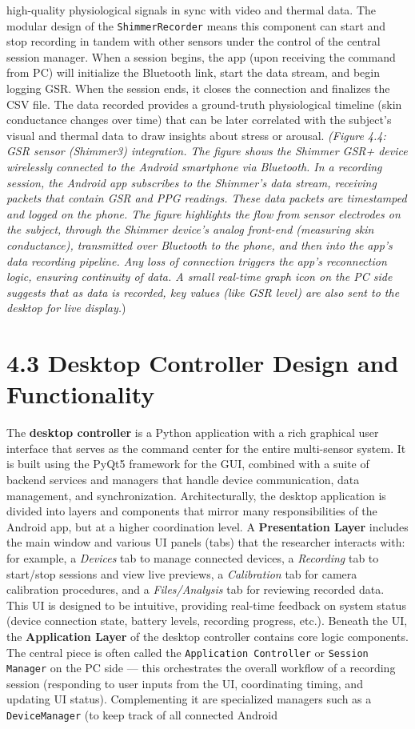 high-quality physiological signals in sync with video and thermal data. The modular design of the \texttt{ShimmerRecorder} means this component can start and stop recording in tandem with other sensors under the control of the central session manager. When a session begins, the app (upon receiving the command from PC) will initialize the Bluetooth link, start the data stream, and begin logging GSR. When the session ends, it closes the connection and finalizes the CSV file. The data recorded provides a ground-truth physiological timeline (skin conductance changes over time) that can be later correlated with the subject's visual and thermal data to draw insights about stress or arousal. \textit{(Figure 4.4: GSR sensor (Shimmer3) integration. The figure shows the Shimmer GSR+ device wirelessly connected to the Android smartphone via Bluetooth. In a recording session, the Android app subscribes to the Shimmer's data stream, receiving packets that contain GSR and PPG readings. These data packets are timestamped and logged on the phone. The figure highlights the flow from} \textit{sensor electrodes on the subject, through the Shimmer device's analog front-end (measuring skin conductance), transmitted over Bluetooth to the phone, and then into the app's data recording pipeline. Any loss of connection triggers the app's reconnection logic, ensuring continuity of data. A small real-time graph icon on the PC side suggests that as data is recorded, key values (like GSR level) are also sent to the desktop for live display.}) \section{4.3 Desktop Controller Design and Functionality} The \textbf{desktop controller} is a Python application with a rich graphical user interface that serves as the command center for the entire multi-sensor system. It is built using the PyQt5 framework for the GUI, combined with a suite of backend services and managers that handle device communication, data management, and synchronization. Architecturally, the desktop application is divided into layers and components that mirror many responsibilities of the Android app, but at a higher coordination level. A \textbf{Presentation Layer} includes the main window and various UI panels (tabs) that the researcher interacts with: for example, a \textit{Devices} tab to manage connected devices, a \textit{Recording} tab to start/stop sessions and view live previews, a \textit{Calibration} tab for camera calibration procedures, and a \textit{Files/Analysis} tab for reviewing recorded data. This UI is designed to be intuitive, providing real-time feedback on system status (device connection state, battery levels, recording progress, etc.). Beneath the UI, the \textbf{Application Layer} of the desktop controller contains core logic components. The central piece is often called the \texttt{Application Controller} or \texttt{Session Manager} on the PC side --- this orchestrates the overall workflow of a recording session (responding to user inputs from the UI, coordinating timing, and updating UI status). Complementing it are specialized managers such as a \texttt{DeviceManager} (to keep track of all connected Android 